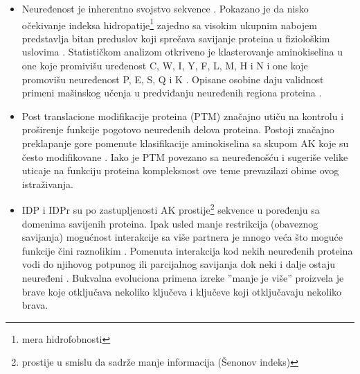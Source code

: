 \begin{itemize}

  \item
    Neuređenost je inherentno svojstvo sekvence \parencite{dunker2001}.
    Pokazano je da nisko očekivanje indeksa hidropatije\footnote{mera hidrofobnosti} zajedno sa visokim
    ukupnim nabojem predstavlja bitan preduslov koji sprečava savijanje
    proteina u fiziološkim uslovima \parencite{uversky2016}. Statističkom
    analizom otkriveno je klasterovanje aminokiselina u one koje promivišu
    uređenost C, W, I, Y, F, L, M, H i N  i one koje
    promovišu neuređenost P, E, S, Q i K .
    \parencite{oldfield2014, uversky2016} Opisane osobine daju validnost
    primeni mašinskog učenja u predviđanju neuređenih regiona proteina
    \parencite{oldfield2014}.

  \item
    Post translacione modifikacije proteina (PTM) značajno utiču na  kontrolu i
    proširenje funkcije pogotovo neuređenih delova proteina. Postoji značajno
    preklapanje gore pomenute klasifikacije aminokiselina sa skupom AK koje su
    često modifikovane \parencite{uversky2016}. Iako je PTM povezano sa
    neuređenošću i sugeriše velike uticaje na funkciju proteina
    \parencite{uversky2016} kompleksnost ove teme prevazilazi obime ovog
    istraživanja.

  \item
    IDP i IDPr su po zastupljenosti AK prostije\footnote{ prostije u smislu da
    sadrže manje informacija (Šenonov indeks)} sekvence u poređenju sa domenima
    savijenih proteina. Ipak usled manje restrikcija (obaveznog savijanja)
    mogućnost interakcije sa više partnera je mnogo veća što moguće funkcije
    čini raznolikim \parencite{uversky2016}.  Pomenuta interakcija kod nekih
    neuređenih proteina vodi do njihovog potpunog ili parcijalnog savijanja dok
    neki i dalje ostaju neuređeni \parencite{uversky2016}.  Bukvalna evoluciona
    primena izreke ''manje je više'' proizvela je brave koje otključava
    nekoliko ključeva i ključeve koji otključavaju nekoliko brava.


\end{itemize}
